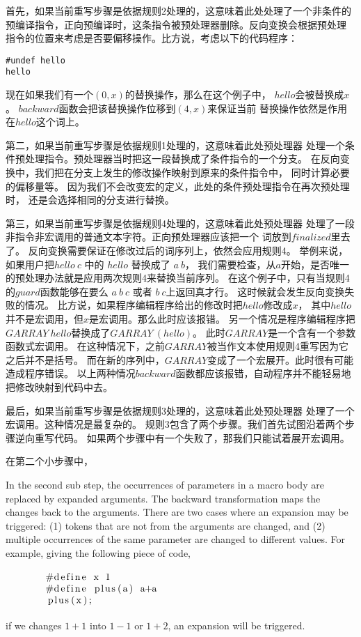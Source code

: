 首先，如果当前重写步骤是依据规则2处理的，这意味着此处处理了一个非条件的
预编译指令，正向预编译时，这条指令被预处理器删除。反向变换会根据预处理
指令的位置来考虑是否要偏移操作。比方说，考虑以下的代码程序：
\begin{lstlisting}
#undef hello
hello
\end{lstlisting}
现在如果我们有一个$(0, x)$的替换操作，那么在这个例子中，
$hello$会被替换成$x$。
$backward$函数会把该替换操作位移到$(4, x)$来保证当前
替换操作依然是作用在$hello$这个词上。

第二，如果当前重写步骤是依据规则1处理的，这意味着此处预处理器
处理一个条件预处理指令。预处理器当时把这一段替换成了条件指令的一个分支。
在反向变换中，我们把在分支上发生的修改操作映射到原来的条件指令中，
同时计算必要的偏移量等。
因为我们不会改变宏的定义，此处的条件预处理指令在再次预处理时，
还是会选择相同的分支进行替换。

第三，如果当前重写步骤是依据规则4处理的，这意味着此处预处理器
处理了一段非指令非宏调用的普通文本字符。正向预处理器应该把一个
词放到$finalized$里去了。
反向变换需要保证在修改过后的词序列上，依然会应用规则4。
举例来说，如果用户把$hello\ c$ 中的 $hello$ 替换成了 $a\ b$，
我们需要检查，从$a$开始，是否唯一的预处理办法就是应用两次规则4来替换当前序列。
在这个例子中，只有当规则4的$guard$函数能够在要么 $a\ b\ c$ 或者 $b\ c$上返回真才行。
这时候就会发生反向变换失败的情况。
比方说，如果程序编辑程序给出的修改时把$hello$修改成$x$，
其中$hello$并不是宏调用，但$x$是宏调用。那么此时应该报错。
另一个情况是程序编辑程序把$GARRAY\ hello$替换成了$GARRAY\ (hello)$。
此时$GARRAY$是一个含有一个参数函数式宏调用。
在这种情况下，之前$GARRAY$被当作文本使用规则4重写因为它之后并不是括号。
而在新的序列中，$GARRAY$变成了一个宏展开。此时很有可能造成程序错误。
以上两种情况$backward$函数都应该报错，自动程序并不能轻易地把修改映射到代码中去。


最后，如果当前重写步骤是依据规则3处理的，这意味着此处预处理器
处理了一个宏调用。这种情况是最复杂的。
规则3包含了两个步骤。我们首先试图沿着两个步骤逆向重写代码。
如果两个步骤中有一个失败了，那我们只能试着展开宏调用。

在第二个小步骤中，

In the second sub step, the occurrences of parameters in a macro body
are replaced by expanded arguments. The backward transformation 
maps the changes back to the arguments. There are two cases where an
expansion may be triggered: (1) tokens that are not from the
arguments are changed, and (2) multiple occurrences of the same
parameter are changed to different values. 
For example, giving the following piece of code,
\begin{equation}\label{eqn:expansion}
  \begin{minipage}{0.8\columnwidth}
\begin{lstlisting}
#define x 1
#define plus(a) a+a
plus(x);
\end{lstlisting}
  \end{minipage}
\end{equation}
if we changes $1+1$ into $1-1$ or $1+2$, an expansion will be triggered.

